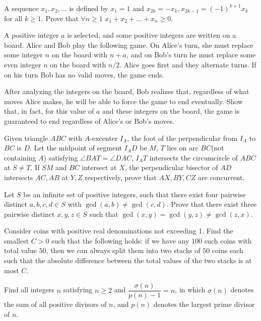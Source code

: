 \documentclass[11pt]{scrartcl}
\begin{document}
\begin{problem}[5326267355571829268]
A sequence $x_1, x_2, \ldots$ is defined by $x_1 = 1$ and $x_{2k}=-x_k, x_{2k-1} = (-1)^{k+1}x_k$ for all $k \geq 1.$ Prove that $\forall n \geq 1$ $x_1 + x_2 + \ldots + x_n \geq 0.$
\end{problem}
\begin{problem}[1473691226426629581]
A positive integer $a$ is selected, and some positive integers are written on a board. Alice and Bob play the following game. On Alice's turn, she must replace some integer $n$ on the board with $n+a$, and on Bob's turn he must replace some even integer $n$ on the board with $n/2$. Alice goes first and they alternate turns. If on his turn Bob has no valid moves, the game ends.

After analyzing the integers on the board, Bob realizes that, regardless of what moves Alice makes, he will be able to force the game to end eventually. Show that, in fact, for this value of $a$ and these integers on the board, the game is guaranteed to end regardless of Alice's or Bob's moves.
\end{problem}
\begin{problem}[5835156231907738776]
Given triangle $ABC$ with $A$-excenter $I_A$, the foot of the perpendicular from $I_A$ to $BC$ is $D$. Let the midpoint of segment $I_AD$ be $M$, $T$ lies on arc $BC$(not containing $A$) satisfying $\angle BAT=\angle DAC$, $I_AT$ intersects the circumcircle of $ABC$ at $S\neq T$. If $SM$ and $BC$ intersect at $X$, the perpendicular bisector of $AD$ intersects $AC,AB$ at $Y,Z$ respectively, prove that $AX,BY,CZ$ are concurrent.
\end{problem}
\begin{problem}[6783316811528119504]
Let $S$ be an infinite set of positive integers, such that there exist four pairwise distinct $a,b,c,d \in S$ with $\gcd(a,b) \neq \gcd(c,d)$. Prove that there exist three pairwise distinct $x,y,z \in S$ such that $\gcd(x,y)=\gcd(y,z) \neq \gcd(z,x)$.
\end{problem}
\begin{problem}[46260042068525]
Consider coins with positive real denominations not exceeding 1. Find the smallest $C>0$ such that the following holds: if we have any $100$ such coins with total value $50$, then we can always split them into two stacks of $50$ coins each such that the absolute difference between the total values of the two stacks is at most $C$.
\end{problem}
\begin{problem}[466409818083772]
Find all integers $n$ satisfying $n \geq 2$ and $\dfrac{\sigma(n)}{p(n)-1} = n$, in which $\sigma(n)$ denotes the sum of all positive divisors of $n$, and $p(n)$ denotes the largest prime divisor of $n$.
\end{problem}
\end{document}
